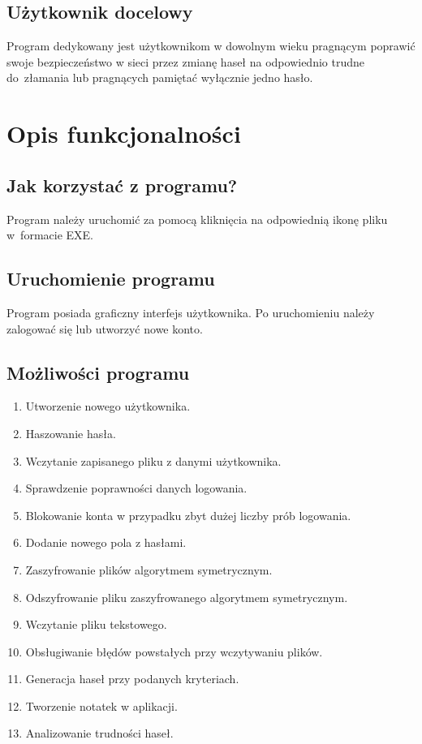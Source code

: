 \documentclass[a4paper]{article}
\begin{document}
\subsection{Użytkownik docelowy}
Program dedykowany jest użytkownikom w dowolnym wieku pragnącym poprawić swoje bezpieczeństwo w sieci przez zmianę haseł na odpowiednio trudne do~złamania lub pragnących pamiętać wyłącznie jedno hasło.

\section{Opis funkcjonalności}
\subsection{Jak korzystać z programu?}
Program należy uruchomić za pomocą kliknięcia na odpowiednią ikonę pliku w~formacie EXE.

\subsection{Uruchomienie programu}
Program posiada graficzny interfejs użytkownika. Po uruchomieniu należy zalogować się lub utworzyć nowe konto.

\subsection{Możliwości programu}
\begin{enumerate}
    \item Utworzenie nowego użytkownika.
    \item Haszowanie hasła.
    \item Wczytanie zapisanego pliku z danymi użytkownika.
    \item Sprawdzenie poprawności danych logowania.
    \item Blokowanie konta w przypadku zbyt dużej liczby prób logowania.
    \item Dodanie nowego pola z hasłami.
    \item Zaszyfrowanie plików algorytmem symetrycznym.
    \item Odszyfrowanie pliku zaszyfrowanego algorytmem symetrycznym.
    \item Wczytanie pliku tekstowego.
    \item Obsługiwanie błędów powstałych przy wczytywaniu plików.
    \item Generacja haseł przy podanych kryteriach.
    \item Tworzenie notatek w aplikacji.
    \item Analizowanie trudności haseł.
\end{enumerate}
\end{document}
